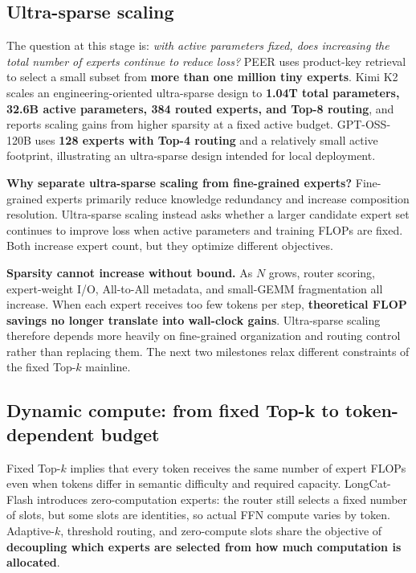 \documentclass[10pt,a4paper,fontset=none]{ctexart}
\newcommand{\term}[1]{\textbf{#1}}
\begin{document}
\subsection{Ultra-sparse scaling}

The question at this stage is: \emph{with active parameters fixed, does increasing the total number of experts continue to reduce loss?} PEER uses product-key retrieval to select a small subset from \textbf{more than one million tiny experts}\cite{he2024peer}. Kimi K2 scales an engineering-oriented ultra-sparse design to \textbf{1.04T total parameters, 32.6B active parameters, 384 routed experts, and Top-8 routing}, and reports scaling gains from higher sparsity at a fixed active budget\cite{kimiK2}. GPT-OSS-120B uses \textbf{128 experts with Top-4 routing} and a relatively small active footprint, illustrating an ultra-sparse design intended for local deployment\cite{openaiGptOss}.

\textbf{Why separate ultra-sparse scaling from fine-grained experts?} Fine-grained experts primarily reduce knowledge redundancy and increase composition resolution. Ultra-sparse scaling instead asks whether a larger candidate expert set continues to improve loss when active parameters and training FLOPs are fixed. Both increase expert count, but they optimize different objectives.

\term{Sparsity cannot increase without bound.} As $N$ grows, router scoring, expert-weight I/O, All-to-All metadata, and small-GEMM fragmentation all increase. When each expert receives too few tokens per step, \textbf{theoretical FLOP savings no longer translate into wall-clock gains}. Ultra-sparse scaling therefore depends more heavily on fine-grained organization and routing control rather than replacing them. The next two milestones relax different constraints of the fixed Top-$k$ mainline.

\subsection{Dynamic compute: from fixed Top-k to token-dependent budget}

Fixed Top-$k$ implies that every token receives the same number of expert FLOPs even when tokens differ in semantic difficulty and required capacity. LongCat-Flash introduces zero-computation experts: the router still selects a fixed number of slots, but some slots are identities, so actual FFN compute varies by token\cite{longcatFlash}. Adaptive-$k$, threshold routing, and zero-compute slots share the objective of \term{decoupling which experts are selected from how much computation is allocated}.
\end{document}
